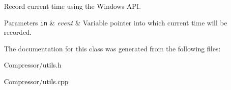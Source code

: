 Record current time using the Windows A\+PI. 


\begin{DoxyParams}[1]{Parameters}
\mbox{\tt in}  & {\em event} & Variable pointer into which current time will be recorded. \\
\hline
\end{DoxyParams}


The documentation for this class was generated from the following files\+:\begin{DoxyCompactItemize}
\item 
Compressor/utils.\+h\item 
Compressor/utils.\+cpp\end{DoxyCompactItemize}
